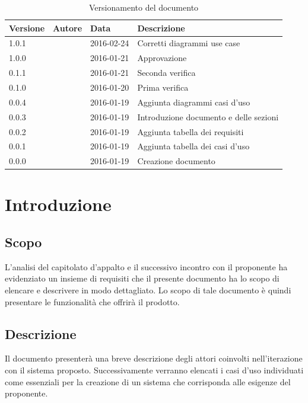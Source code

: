 \documentclass[12pt,a4paper]{article}
\begin{document}
\begin{table}[H]
	\begin{center}
		\begin{tabular}{p{} p{} p{} p{}}
			\toprule
			\textbf{Versione}	&	\textbf{Autore}	&	\textbf{Data}	&	\textbf{Descrizione}\\
			\midrule
            \midrule
			1.0.1 & \NDC{} & 2016-02-24 &  Corretti diagrammi use case \\
			\midrule
			1.0.0 & \NDC{} & 2016-01-21 &  Approvazione \\
			\midrule
			0.1.1 & \IB{} & 2016-01-21 &  Seconda verifica \\
			\midrule
			0.1.0 & \AVI{} & 2016-01-20 &  Prima verifica \\
			\midrule
            0.0.4 & \TP{} & 2016-01-19 & Aggiunta diagrammi casi d'uso\\
            \midrule
			0.0.3 & \AVE{} & 2016-01-19 &  Introduzione documento e delle sezioni  \\
			\midrule
			0.0.2 & \AB{} & 2016-01-19 &  Aggiunta tabella dei requisiti \\
			\midrule
			0.0.1 & \WS{} & 2016-01-19 &  Aggiunta tabella dei casi d'uso \\
			\midrule
			0.0.0 & \NDC{} & 2016-01-19 &  Creazione documento \\
			\bottomrule
		\end{tabular}
		\caption{Versionamento del documento}
		\label{tabVers1}
	\end{center}
\end{table}
\newpage

\tableofcontents
\listoftables
\newpage

\section{Introduzione}

\subsection{Scopo}
L’analisi del capitolato d’appalto e il successivo incontro con il proponente ha evidenziato un insieme di requisiti che il presente documento ha lo scopo di elencare e descrivere in modo dettagliato. Lo scopo di tale documento è quindi presentare le funzionalità che offrirà il prodotto.

\subsection{Descrizione}
Il documento presenterà una breve descrizione degli attori coinvolti nell'iterazione con il sistema proposto. Successivamente verranno elencati i casi d'uso individuati come essenziali per la creazione di un sistema che corrisponda alle esigenze del proponente.
\end{document}

